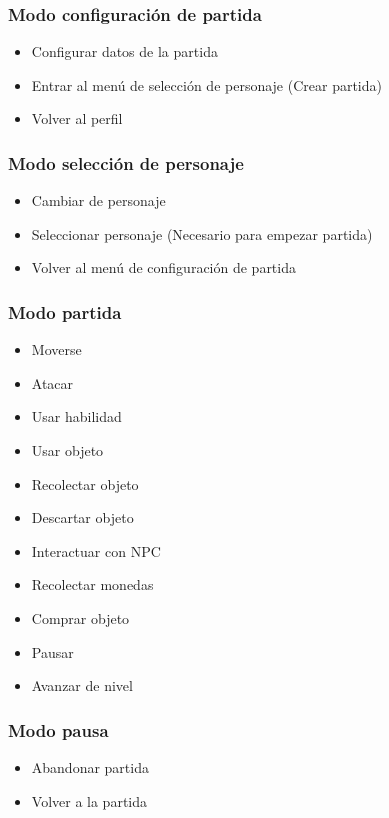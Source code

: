 \subsubsection{Modo configuración de partida}
\begin{itemize}
    \item Configurar datos de la partida
    \item Entrar al menú de selección de personaje (Crear partida)
    \item Volver al perfil
\end{itemize}

\subsubsection{Modo selección de personaje}
\begin{itemize}
    \item Cambiar de personaje
    \item Seleccionar personaje (Necesario para empezar partida)
    \item Volver al menú de configuración de partida
\end{itemize}

\subsubsection{Modo partida}

\begin{itemize}
    \item Moverse
    \item Atacar
    \item Usar habilidad
    \item Usar objeto
    \item Recolectar objeto
    \item Descartar objeto
    \item Interactuar con NPC
    \item Recolectar monedas
    \item Comprar objeto
    \item Pausar
    \item Avanzar de nivel
\end{itemize}

\subsubsection{Modo pausa}
\begin{itemize}
    \item Abandonar partida
    \item Volver a la partida
\end{itemize}

